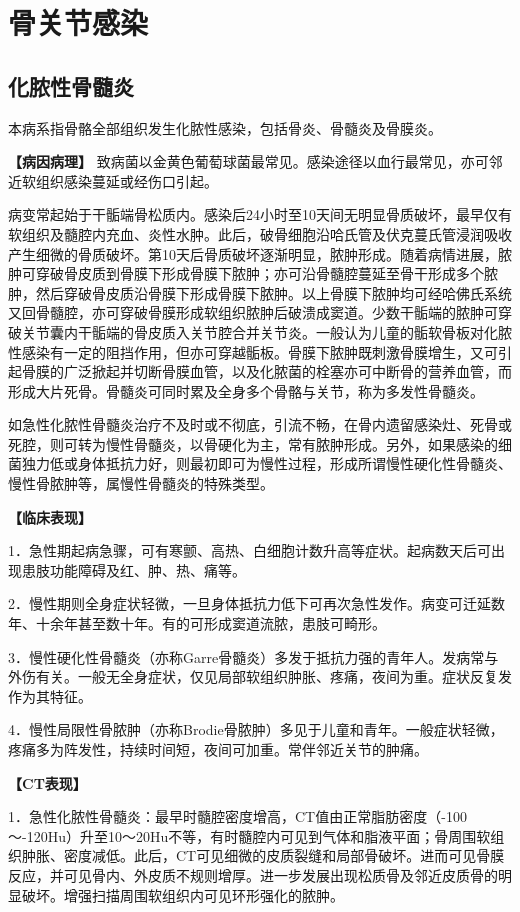 \section{骨关节感染}

\subsection{化脓性骨髓炎}

本病系指骨骼全部组织发生化脓性感染，包括骨炎、骨髓炎及骨膜炎。

\textbf{【病因病理】}
致病菌以金黄色葡萄球菌最常见。感染途径以血行最常见，亦可邻近软组织感染蔓延或经伤口引起。

病变常起始于干骺端骨松质内。感染后24小时至10天间无明显骨质破坏，最早仅有软组织及髓腔内充血、炎性水肿。此后，破骨细胞沿哈氏管及伏克蔓氏管浸润吸收产生细微的骨质破坏。第10天后骨质破坏逐渐明显，脓肿形成。随着病情进展，脓肿可穿破骨皮质到骨膜下形成骨膜下脓肿；亦可沿骨髓腔蔓延至骨干形成多个脓肿，然后穿破骨皮质沿骨膜下形成骨膜下脓肿。以上骨膜下脓肿均可经哈佛氏系统又回骨髓腔，亦可穿破骨膜形成软组织脓肿后破溃成窦道。少数干骺端的脓肿可穿破关节囊内干骺端的骨皮质入关节腔合并关节炎。一般认为儿童的骺软骨板对化脓性感染有一定的阻挡作用，但亦可穿越骺板。骨膜下脓肿既刺激骨膜增生，又可引起骨膜的广泛掀起并切断骨膜血管，以及化脓菌的栓塞亦可中断骨的营养血管，而形成大片死骨。骨髓炎可同时累及全身多个骨骼与关节，称为多发性骨髓炎。

如急性化脓性骨髓炎治疗不及时或不彻底，引流不畅，在骨内遗留感染灶、死骨或死腔，则可转为慢性骨髓炎，以骨硬化为主，常有脓肿形成。另外，如果感染的细菌独力低或身体抵抗力好，则最初即可为慢性过程，形成所谓慢性硬化性骨髓炎、慢性骨脓肿等，属慢性骨髓炎的特殊类型。

\textbf{【临床表现】}

1．急性期起病急骤，可有寒颤、高热、白细胞计数升高等症状。起病数天后可出现患肢功能障碍及红、肿、热、痛等。

2．慢性期则全身症状轻微，一旦身体抵抗力低下可再次急性发作。病变可迁延数年、十余年甚至数十年。有的可形成窦道流脓，患肢可畸形。

3．慢性硬化性骨髓炎（亦称Garre骨髓炎）多发于抵抗力强的青年人。发病常与外伤有关。一般无全身症状，仅见局部软组织肿胀、疼痛，夜间为重。症状反复发作为其特征。

4．慢性局限性骨脓肿（亦称Brodie骨脓肿）多见于儿童和青年。一般症状轻微，疼痛多为阵发性，持续时间短，夜间可加重。常伴邻近关节的肿痛。

\textbf{【CT表现】}

1．急性化脓性骨髓炎：最早时髓腔密度增高，CT值由正常脂肪密度（-100～-120Hu）升至10～20Hu不等，有时髓腔内可见到气体和脂液平面；骨周围软组织肿胀、密度减低。此后，CT可见细微的皮质裂缝和局部骨破坏。进而可见骨膜反应，并可见骨内、外皮质不规则增厚。进一步发展出现松质骨及邻近皮质骨的明显破坏。增强扫描周围软组织内可见环形强化的脓肿。

